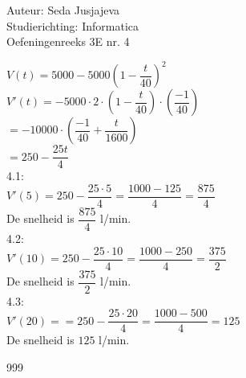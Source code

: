 \documentclass[a4paper]{article}
\begin{document}
\noindent \large Auteur: Seda Jusjajeva\\
\noindent \large Studierichting: Informatica\\
\noindent \large Oefeningenreeks 3E nr. 4 \\

\medskip

\normalsize


$V(t) = 5000 - 5000\left(1 - \dfrac{t}{40}\right)^{2}$ \\

$V'(t) = -5000\cdot2\cdot\left(1 - \dfrac{t}{40}\right)\cdot\left(\dfrac{-1}{40}\right)$ \\

$= -10000 \cdot \left(\dfrac{-1}{40} + \dfrac{t}{1600}\right)$ \\

$= 250-\dfrac{25t}{4}$ \\

4.1: \\

$V'(5) = 250 - \dfrac{25\cdot5}{4} = \dfrac{1000 - 125}{4} = \dfrac{875}{4}$ \\

De snelheid is $\dfrac{875}{4}$ l/min. \\

4.2: \\

$V'(10) = 250 - \dfrac{25\cdot10}{4} = \dfrac{1000 - 250}{4} = \dfrac{375}{2}$ \\

De snelheid is $\dfrac{375}{2}$ l/min. \\

4.3: \\

$V'(20) = = 250 - \dfrac{25\cdot20}{4} = \dfrac{1000 - 500}{4} = 125$ \\

De snelheid is $125$ l/min. \\



\begin{thebibliography}{999}
\end{thebibliography}
\end{document}
